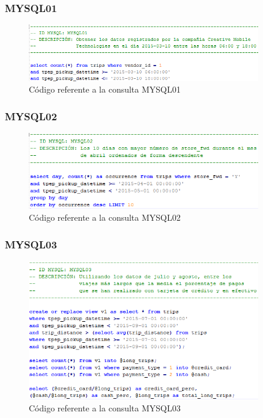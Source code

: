 \subsubsection[]{MYSQL01}

\begin{figure}[h]
	\centering
	\includegraphics[width=0.9\textwidth]{Ilustraciones/MYSQL01.png}
	\caption{Código referente a la consulta MYSQL01}
\end{figure}

\subsubsection[]{MYSQL02}

\begin{figure}[h]
	\centering
	\includegraphics[width=0.9\textwidth]{Ilustraciones/MYSQL02.png}
	\caption{Código referente a la consulta MYSQL02}
\end{figure}

\clearpage

\subsubsection[]{MYSQL03}

\begin{figure}[h]
	\centering
	\includegraphics[width=0.9\textwidth]{Ilustraciones/MYSQL03.png}
	\caption{Código referente a la consulta MYSQL03}
\end{figure}

